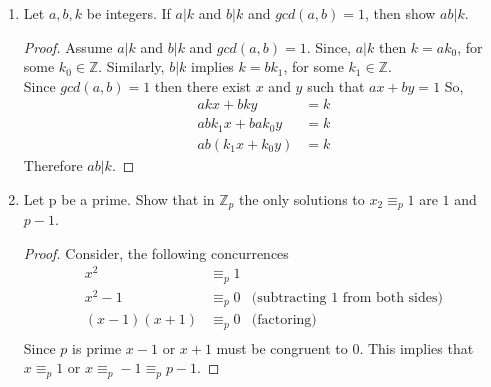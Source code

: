 \documentclass{article}
\newcommand{\Z}{\mathbb{Z}}
\newcommand{\R}{\mathbb{R}}
\begin{document}
\begin{enumerate}
\begin{enumerate}
\begin{proof}
		\end{proof}
		
		\item Prove or disprove that the relationship $\triangleleft$ transitive
		\begin{proof}
			Let $(x_0,y_0), (x_1,y_1), (x_2,y_2) \in \R^2$, with $(x_0,y_0) \triangleleft (x_1, y_1)$ and $(x_1, y_1) \triangleleft (x_2,y_2)$.\\
			  $(x_0,y_0) \triangleleft (x_1, y_1)$, implies $|x_0| = |x_1|$ and $|y_0| = |y_1|$.\\
			 Similarly, $(x_1,y_1) \triangleleft (x_2, y_2)$, implies $|x_1| = |x_2|$ and $|y_1| = |y_2|$.\\
			 Therefore, $|x_0| = |x_2|$ and $|y_0|= |y_2|$ and $(x_0, y_0) \triangleleft (x_2,y_2)$. 
			 Thus, the relation $\triangleleft$ is transitive.    
		\end{proof}
	\end{enumerate}
	\item Let $a, b, k$ be integers. If $a|k$ and $b|k$ and $gcd(a, b) = 1$, then show $ab|k$. 
	\begin{proof}
	 	Assume $a|k$ and $b|k$ and $gcd(a, b) = 1$. 
	 	Since, $a|k$ then $k=ak_0$, for some $k_0 \in \Z$.
	 	Similarly, $b|k$ implies $k=bk_1$, for some $k_1 \in \Z$.\\
	 	Since $gcd(a, b) = 1$ then there exist $x$ and $y$ such that $ax+by=1$
	 	So,
	 	\begin{align*}
	 		akx+bky&=k\\
	 		abk_1x + bak_0y &=k\\
	 		ab(k_1x + k_0y) &=k
	 	\end{align*}
	 	Therefore $ab|k$.
	\end{proof}
	
	\item Let p be a prime. Show that in $\Z_p$ the only solutions to $x_2 \equiv_p 1$ are $1$ and $p - 1$.
	\begin{proof}
		Consider, the following concurrences 
		\begin{align*}
			x^2 &\equiv_p 1\\
			x^2 -1 &\equiv_p 0     &\text{(subtracting 1 from both sides)}\\
			(x-1)(x+1) &\equiv_p 0 &\text{(factoring)}\\
		\end{align*} 
		Since $p$ is prime $x-1$ or $x+1$ must be congruent to 0. This implies that $x\equiv_p 1$ or $x \equiv_p -1 \equiv_p p-1.$
		 
	\end{proof}
	
	\end{enumerate}		
\end{document}
